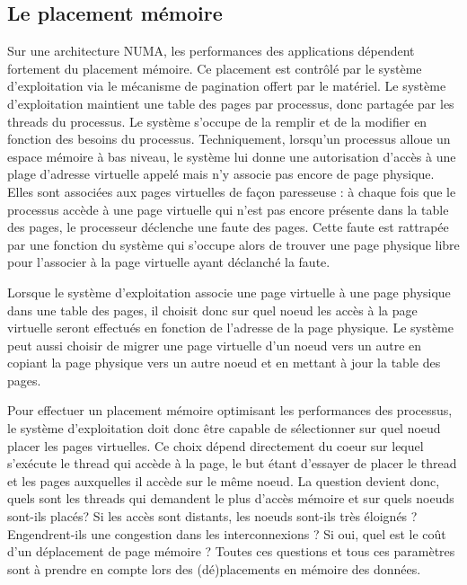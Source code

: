     \subsection{Le placement mémoire}

      Sur une architecture NUMA, les performances des applications dépendent
      fortement du placement mémoire. Ce placement est contrôlé par le système
      d'exploitation via le mécanisme de pagination offert par le matériel. Le
      système d'exploitation maintient une table des pages par processus, donc
      partagée par les threads du processus. Le système s'occupe de la remplir
      et de la modifier en fonction des besoins du processus. Techniquement,
      lorsqu'un processus alloue un espace mémoire à bas niveau, le système lui
      donne une autorisation d'accès à une plage d'adresse virtuelle appelé mais
      n'y associe pas encore de page physique. Elles sont associées aux pages
      virtuelles de façon paresseuse : à chaque fois que le processus accède à
      une page virtuelle qui n'est pas encore présente dans la table des pages,
      le processeur déclenche une faute des pages. Cette faute est rattrapée par
      une fonction du système qui s'occupe alors de trouver une page physique
      libre pour l'associer à la page virtuelle ayant déclanché la
      faute.\newline
      
      Lorsque le système d'exploitation associe une page virtuelle à une page
      physique dans une table des pages, il choisit donc sur quel noeud les
      accès à la page virtuelle seront effectués en fonction de l'adresse de la
      page physique. Le système peut aussi choisir de migrer une page virtuelle
      d'un noeud vers un autre en copiant la page physique vers un autre noeud
      et en mettant à jour la table des pages.\newline

      Pour effectuer un placement mémoire optimisant les performances des
      processus, le système d'exploitation doit donc être capable de
      sélectionner sur quel noeud placer les pages virtuelles. Ce choix dépend
      directement du coeur sur lequel s'exécute le thread qui accède à la page,
      le but étant d'essayer de placer le thread et les pages auxquelles il
      accède sur le même noeud. La question devient donc, quels sont les threads
      qui demandent le plus d’accès mémoire et sur quels noeuds sont-ils placés?
      Si les accès sont distants, les noeuds sont-ils très éloignés ?
      Engendrent-ils une congestion dans les interconnexions ? Si oui, quel est
      le coût d'un déplacement de page mémoire ? Toutes ces questions et tous
      ces paramètres sont à prendre en compte lors des (dé)placements en mémoire
      des données.

